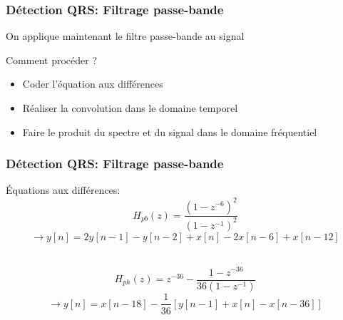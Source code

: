 \documentclass{beamer}
\begin{document}
 \begin{frame}
 \frametitle{Détection QRS: Filtrage passe-bande}
 On applique maintenant le filtre passe-bande au signal \\
 
\vspace{0.2cm}

Comment procéder ? \\
\vspace{0.2cm}
 \begin{itemize}
 \item Coder l'équation aux différences 
 \vspace{0.1cm}
 \item Réaliser la convolution dans le domaine temporel 
 \vspace{0.1cm}
 \item Faire le produit du spectre et du signal dans le domaine fréquentiel
 \end{itemize}
 \vspace{0.2cm}
 \end{frame}
 
  \begin{frame}
 \frametitle{Détection QRS: Filtrage passe-bande}
 \'Equations aux différences: \\
 \vspace{0.1cm}
  \[H_{pb}(z) = \frac{(1 -z^{-6})^2}{(1 - z^{-1} )^2}\] \[  \rightarrow  y[n] =  2y[n-1]- y[n-2] + x[n] - 2x[n-6] + x[n-12] \]\\
  \vspace{0.2cm}
  
  \[ H_{ph}(z) = z^{-36} - \frac{1 -z^{-36}}{36(1 - z^{-1})}\]
  \[ \rightarrow y[n] = x[n-18] -\frac{1}{36}[y[n-1] + x[n] - x[n-36] ]  \]\\
 \vspace{0.2cm}
  \end{frame}
  
\end{document}
